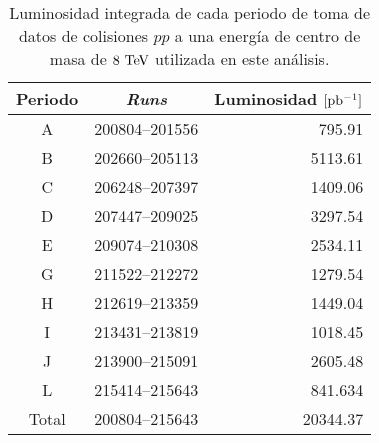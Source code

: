 
\begin{table}[ht]
  \centering
  \caption{Luminosidad integrada de cada periodo de toma de datos de colisiones
    $pp$ a una energía de centro de masa de $8 \tev$ utilizada en este
    análisis.}
  \begin{tabular}{c|c|r}
    \hline \hline Periodo & \emph{Runs} & Luminosidad $[\mbox{pb$^{-1}$}]$ \\
    \hline \hline
    A & 200804--201556 & 795.91 \\
    B & 202660--205113 & 5113.61 \\
    C & 206248--207397 & 1409.06 \\
    D & 207447--209025 & 3297.54 \\
    E & 209074--210308 & 2534.11 \\
    G & 211522--212272 & 1279.54 \\
    H & 212619--213359 & 1449.04 \\
    I & 213431--213819 & 1018.45 \\
    J & 213900--215091 & 2605.48 \\
    L & 215414--215643 & 841.634 \\
    \hline \hline
    Total & 200804--215643 & 20344.37 \\
    \hline \hline
  \end{tabular}
  \label{tab:data_periods}
\end{table}



